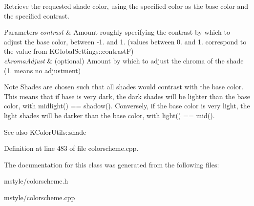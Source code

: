Retrieve the requested shade color, using the specified color as the base color and the specified contrast.


\begin{DoxyParams}{Parameters}
{\em contrast} & Amount roughly specifying the contrast by which to adjust the base color, between -\/1. and 1. (values between 0. and 1. correspond to the value from K\+Global\+Settings\+::contrastF) \\
\hline
{\em chroma\+Adjust} & (optional) Amount by which to adjust the chroma of the shade (1. means no adjustment)\\
\hline
\end{DoxyParams}
\begin{DoxyNote}{Note}
Shades are chosen such that all shades would contrast with the base color. This means that if base is very dark, the \textquotesingle{}dark\textquotesingle{} shades will be lighter than the base color, with midlight() == shadow(). Conversely, if the base color is very light, the \textquotesingle{}light\textquotesingle{} shades will be darker than the base color, with light() == mid().
\end{DoxyNote}
\begin{DoxySeeAlso}{See also}
K\+Color\+Utils\+::shade 
\end{DoxySeeAlso}


Definition at line 483 of file colorscheme.\+cpp.



The documentation for this class was generated from the following files\+:\begin{DoxyCompactItemize}
\item 
mstyle/colorscheme.\+h\item 
mstyle/colorscheme.\+cpp\end{DoxyCompactItemize}
